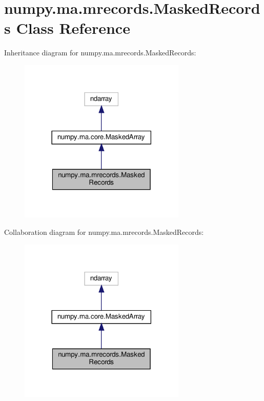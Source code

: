 \hypertarget{classnumpy_1_1ma_1_1mrecords_1_1MaskedRecords}{}\section{numpy.\+ma.\+mrecords.\+Masked\+Records Class Reference}
\label{classnumpy_1_1ma_1_1mrecords_1_1MaskedRecords}


Inheritance diagram for numpy.\+ma.\+mrecords.\+Masked\+Records\+:
\nopagebreak
\begin{figure}[H]
\begin{center}
\leavevmode
\includegraphics[width=225pt]{classnumpy_1_1ma_1_1mrecords_1_1MaskedRecords__inherit__graph}
\end{center}
\end{figure}


Collaboration diagram for numpy.\+ma.\+mrecords.\+Masked\+Records\+:
\nopagebreak
\begin{figure}[H]
\begin{center}
\leavevmode
\includegraphics[width=225pt]{classnumpy_1_1ma_1_1mrecords_1_1MaskedRecords__coll__graph}
\end{center}
\end{figure}
